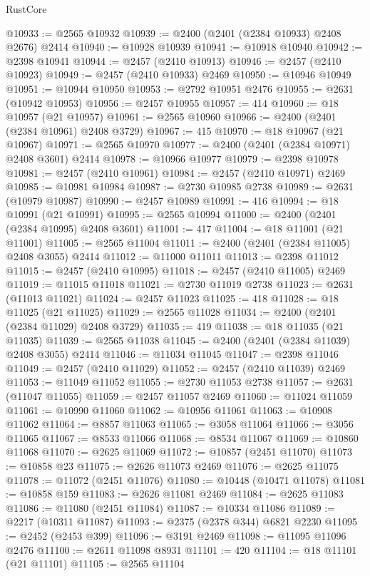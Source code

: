 \begin{lexlean}{RustCore}
\begin{coremodule}
@10933 := @2565 @10932
@10939 := @2400 (@2401 (@2384 @10933) @2408 @2676) @2414
@10940 := @10928 @10939
@10941 := @10918 @10940
@10942 := @2398 @10941
@10944 := @2457 (@2410 @10913)
@10946 := @2457 (@2410 @10923)
@10949 := @2457 (@2410 @10933) @2469
@10950 := @10946 @10949
@10951 := @10944 @10950
@10953 := @2792 @10951 @2476
@10955 := @2631 (@10942 @10953)
@10956 := @2457 @10955
@10957 := 414
@10960 := @18 @10957 (@21 @10957)
@10961 := @2565 @10960
@10966 := @2400 (@2401 (@2384 @10961) @2408 @3729)
@10967 := 415
@10970 := @18 @10967 (@21 @10967)
@10971 := @2565 @10970
@10977 := @2400 (@2401 (@2384 @10971) @2408 @3601) @2414
@10978 := @10966 @10977
@10979 := @2398 @10978
@10981 := @2457 (@2410 @10961)
@10984 := @2457 (@2410 @10971) @2469
@10985 := @10981 @10984
@10987 := @2730 @10985 @2738
@10989 := @2631 (@10979 @10987)
@10990 := @2457 @10989
@10991 := 416
@10994 := @18 @10991 (@21 @10991)
@10995 := @2565 @10994
@11000 := @2400 (@2401 (@2384 @10995) @2408 @3601)
@11001 := 417
@11004 := @18 @11001 (@21 @11001)
@11005 := @2565 @11004
@11011 := @2400 (@2401 (@2384 @11005) @2408 @3055) @2414
@11012 := @11000 @11011
@11013 := @2398 @11012
@11015 := @2457 (@2410 @10995)
@11018 := @2457 (@2410 @11005) @2469
@11019 := @11015 @11018
@11021 := @2730 @11019 @2738
@11023 := @2631 (@11013 @11021)
@11024 := @2457 @11023
@11025 := 418
@11028 := @18 @11025 (@21 @11025)
@11029 := @2565 @11028
@11034 := @2400 (@2401 (@2384 @11029) @2408 @3729)
@11035 := 419
@11038 := @18 @11035 (@21 @11035)
@11039 := @2565 @11038
@11045 := @2400 (@2401 (@2384 @11039) @2408 @3055) @2414
@11046 := @11034 @11045
@11047 := @2398 @11046
@11049 := @2457 (@2410 @11029)
@11052 := @2457 (@2410 @11039) @2469
@11053 := @11049 @11052
@11055 := @2730 @11053 @2738
@11057 := @2631 (@11047 @11055)
@11059 := @2457 @11057 @2469
@11060 := @11024 @11059
@11061 := @10990 @11060
@11062 := @10956 @11061
@11063 := @10908 @11062
@11064 := @8857 @11063
@11065 := @3058 @11064
@11066 := @3056 @11065
@11067 := @8533 @11066
@11068 := @8534 @11067
@11069 := @10860 @11068
@11070 := @2625 @11069
@11072 := @10857 (@2451 @11070)
@11073 := @10858 @23
@11075 := @2626 @11073 @2469
@11076 := @2625 @11075
@11078 := @11072 (@2451 @11076)
@11080 := @10448 (@10471 @11078)
@11081 := @10858 @159
@11083 := @2626 @11081 @2469
@11084 := @2625 @11083
@11086 := @11080 (@2451 @11084)
@11087 := @10334 @11086
@11089 := @2217 (@10311 @11087)
@11093 := @2375 (@2378 @344) @6821 @2230
@11095 := @2452 (@2453 @399)
@11096 := @3191 @2469
@11098 := @11095 @11096 @2476
@11100 := @2611 @11098 @8931
@11101 := 420
@11104 := @18 @11101 (@21 @11101)
@11105 := @2565 @11104

\end{coremodule}
\end{lexlean}
